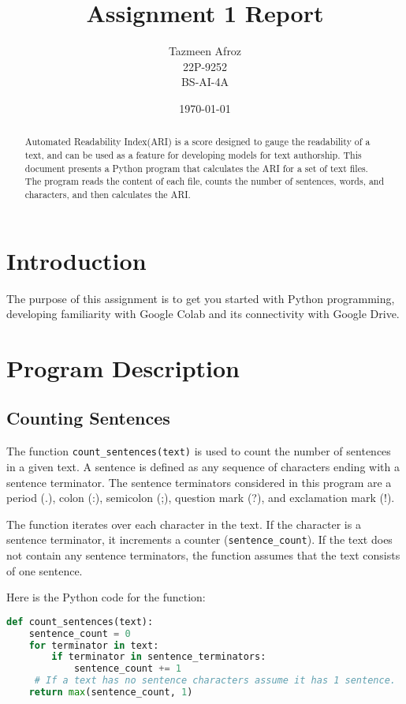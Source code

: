\documentclass{article}
\title{Assignment 1 Report }
\author{Tazmeen Afroz \\22P-9252 \\ BS-AI-4A}
\date{\today}
\begin{document}
\maketitle

\begin{abstract}
Automated Readability Index(ARI) is a score designed to gauge the readability of a text, and can be used
as a feature for developing models for text authorship.
This document presents a Python program that calculates the ARI for a set of text files. The program reads the content of each file, counts the number of sentences, words, and characters, and then calculates the ARI. 
\end{abstract}

\section{Introduction}

The purpose of this assignment is to get you started with Python programming, developing
familiarity with Google Colab and its connectivity with Google Drive.


\section{Program Description}

\subsection{Counting Sentences}

The function \texttt{count\_sentences(text)} is used to count the number of sentences in a given text. A sentence is defined as any sequence of characters ending with a sentence terminator. The sentence terminators considered in this program are a period (.), colon (:), semicolon (;), question mark (?), and exclamation mark (!).

The function iterates over each character in the text. If the character is a sentence terminator, it increments a counter (\texttt{sentence\_count}). If the text does not contain any sentence terminators, the function assumes that the text consists of one sentence.

Here is the Python code for the function:

\begin{lstlisting}[language=Python]
def count_sentences(text):
    sentence_count = 0
    for terminator in text:
        if terminator in sentence_terminators:
            sentence_count += 1
     # If a text has no sentence characters assume it has 1 sentence.
    return max(sentence_count, 1)

\end{lstlisting}
\end{document}
